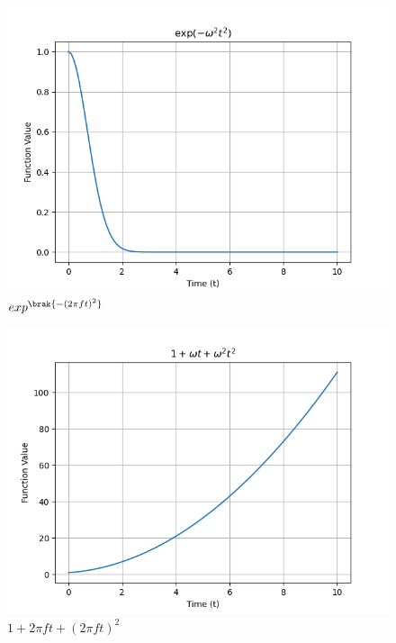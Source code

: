 \documentclass[journal,12pt,onecolumn]{IEEEtran}
\theoremstyle{remark}
\begin{document}
\begin{figure}[h!]
    \centering
    \includegraphics[width=\columnwidth]{ncert-physics/11/14/4/figs/11.14.4 f5.png}
    \caption{$exp^{\brak{-(2\pi ft)^2}}$}
    \label{fig:11.14.4.5}
\end{figure}
\begin{figure}[h!]
    \centering
    \includegraphics[width=\columnwidth]{ncert-physics/11/14/4/figs/11.14.4 f6.png}
    \caption{$1+2\pi f t+(2\pi f t)^2$}
    \label{fig:11.14.4.6}
\end{figure}
\end{document}
